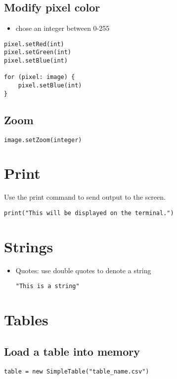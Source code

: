 \documentclass{article}
\begin{document}
\subsection{Modify pixel color}
\begin{itemize}
  \item chose an integer between 0-255
\end{itemize}
\begin{lstlisting}
pixel.setRed(int)
pixel.setGreen(int)
pixel.setBlue(int)

for (pixel: image) {
    pixel.setBlue(int)
}
\end{lstlisting}

\subsection{Zoom}
\begin{lstlisting}
image.setZoom(integer)
\end{lstlisting}

\section{Print}
Use the print command to send output to the screen.

\begin{lstlisting}
print("This will be displayed on the terminal.")
\end{lstlisting}

\section{Strings}

\begin{itemize}
  \item Quotes: use double quotes to denote a string
\begin{lstlisting}
"This is a string"
\end{lstlisting}

\end{itemize}

\section{Tables}

\subsection{Load a table into memory}
\begin{lstlisting}
table = new SimpleTable("table_name.csv")
\end{lstlisting}
\end{document}
